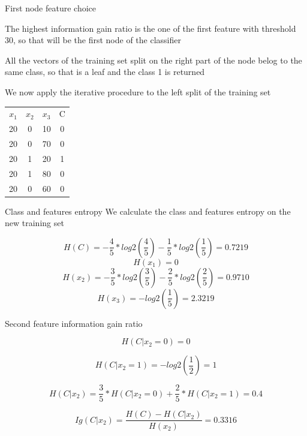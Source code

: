 \begin{frame}{First node feature choice}
	
	The highest information gain ratio is the one of the first feature with threshold 30, so that will be the first node of the classifier
	
	All the vectors of the training set split on the right part of the node belog to the same class, so that is a leaf and the class 1 is returned
	
	We now apply the iterative procedure to the left split of the training set
	
\begin{center}
	\begin{tabular}{c|c|c|c}
		$x_1$ & $x_2$ & $x_3$ & C \\
		20 & 0 & 10 & 0 \\
		20 & 0 & 70 & 0 \\
		20 & 1 & 20 & 1 \\
		20 & 1 & 80 & 0 \\
		20 & 0 & 60 & 0 \\
	\end{tabular}
\end{center}

\end{frame}

\begin{frame}{Class and features entropy}
	We calculate the class and features entropy on the new training set
	
	\[
		H(C) = - \frac{4}{5} * log2\left(\frac{4}{5}\right) 
		- \frac{1}{5} * log2\left(\frac{1}{5}\right) = 0.7219
	\]
	\[ 	H(x_1) = 0
	\]
	\[ 	H(x_2) = - \frac{3}{5} * log2\left(\frac{3}{5}\right)
	- \frac{2}{5} * log2\left(\frac{2}{5}\right) = 0.9710
	\]
	\[ 	H(x_3) = - log2\left(\frac{1}{5}\right) = 2.3219
	\]
	
\end{frame}

\begin{frame}{Second feature information gain ratio}
	
	\[ 
		H(C|x_2 = 0) = 0
	\]
	
	\[ 
		H(C|x_2 = 1) = - log2\left(\frac{1}{2}\right) = 1
	\]
	
	\[ 
		H(C|x_2) = \frac{3}{5} * H(C|x_2 = 0) +
		\frac{2}{5} * H(C|x_2 = 1) = 0.4
	\]

	\[ 
		Ig(C|x_2) = \frac{H(C) - H(C|x_2)}{H(x_2)} = 0.3316
	\]
	
\end{frame}

